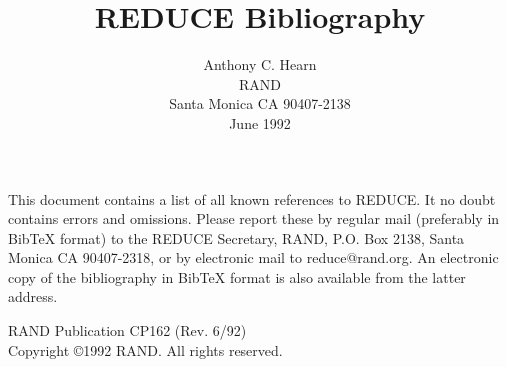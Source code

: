 %
%
\def\thebibliography#1{\section*{}\list
 {[\arabic{enumi}]}{\settowidth\labelwidth{[#1]}\leftmargin\labelwidth
 \advance\leftmargin\labelsep
 \usecounter{enumi}}
 \def\newblock{\hskip .11em plus .33em minus .07em}
 \sloppy\clubpenalty4000\widowpenalty4000
 \sfcode`\.=1000\relax}
\textwidth 6.6in\textheight 9in\columnwidth\textwidth
\hoffset-2cm

\setcounter{page}{0}
\title{REDUCE Bibliography}
\author{Anthony C. Hearn\\
RAND \\
Santa Monica CA 90407-2138  \vspace {.5cm} \\
June 1992}
\date{}
\maketitle
\vspace{1cm}
This document contains a list of all known references to REDUCE.  It no doubt
contains errors and omissions.  Please report these by regular mail
(preferably in BibTeX format) to the REDUCE Secretary, RAND, P.O. Box 2138,
Santa Monica CA 90407-2318, or by electronic mail to reduce@rand.org.  An
electronic copy of the bibliography in BibTeX format is also available from
the latter address.
\begin{center}
\vspace{9.0cm}
RAND Publication CP162 (Rev. 6/92) \vspace*{.5cm} \\
Copyright \copyright 1992 RAND.  All rights reserved.
\end{center}
\newpage
\voffset-2.5cm

